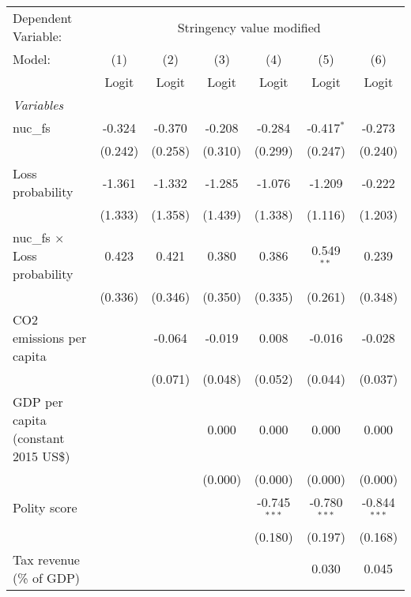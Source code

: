 
\begingroup
\centering
\begin{tabular}{lcccccc}
   \toprule
   Dependent Variable: & \multicolumn{6}{c}{Stringency value modified}\\
   Model:                               & (1)     & (2)     & (3)     & (4)            & (5)            & (6)\\  
                                        &  Logit  & Logit   & Logit   & Logit          & Logit          & Logit\\  
   \midrule
   \emph{Variables}\\
   nuc\_fs                              & -0.324  & -0.370  & -0.208  & -0.284         & -0.417$^{*}$   & -0.273\\   
                                        & (0.242) & (0.258) & (0.310) & (0.299)        & (0.247)        & (0.240)\\   
   Loss probability                     & -1.361  & -1.332  & -1.285  & -1.076         & -1.209         & -0.222\\   
                                        & (1.333) & (1.358) & (1.439) & (1.338)        & (1.116)        & (1.203)\\   
   nuc\_fs $\times$ Loss probability    & 0.423   & 0.421   & 0.380   & 0.386          & 0.549$^{**}$   & 0.239\\   
                                        & (0.336) & (0.346) & (0.350) & (0.335)        & (0.261)        & (0.348)\\   
   CO2 emissions per capita             &         & -0.064  & -0.019  & 0.008          & -0.016         & -0.028\\   
                                        &         & (0.071) & (0.048) & (0.052)        & (0.044)        & (0.037)\\   
   GDP per capita (constant 2015 US\$)  &         &         & 0.000   & 0.000          & 0.000          & 0.000\\   
                                        &         &         & (0.000) & (0.000)        & (0.000)        & (0.000)\\   
   Polity score                         &         &         &         & -0.745$^{***}$ & -0.780$^{***}$ & -0.844$^{***}$\\   
                                        &         &         &         & (0.180)        & (0.197)        & (0.168)\\   
   Tax revenue (\% of GDP)              &         &         &         &                & 0.030          & 0.045\\   

\end{tabular}
